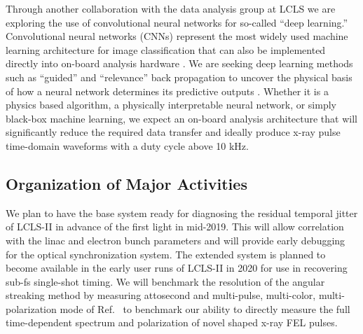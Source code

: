 \documentclass[letterpaper,oneside,11pt]{article}
\begin{document}
Through another collaboration with the data analysis group at LCLS we are exploring the use of convolutional neural networks for so-called ``deep learning.'' %
Convolutional neural networks (CNNs) represent the most widely used machine learning architecture for image classification that can also be implemented directly into on-board analysis hardware \cite{cognimem}.
We are seeking deep learning methods such as ``guided'' and ``relevance'' back propagation to uncover the physical basis of how a neural network determines its predictive outputs \cite{Mihir}.
Whether it is a physics based algorithm, a physically interpretable neural network, or simply black-box machine learning, we expect an on-board analysis architecture that will significantly reduce the required data transfer and ideally produce x-ray pulse time-domain waveforms with a duty cycle above 10 kHz.





\subsection*{Organization of Major Activities\label{timeline}}

We plan to have the base system ready for diagnosing the residual temporal jitter of LCLS-II in advance of the first light in mid-2019.
This will allow correlation with the linac and electron bunch parameters and will provide early debugging for the optical synchronization system.
The extended system is planned to become available in the early user runs of LCLS-II in 2020 for use in recovering sub-fs single-shot timing.
We will benchmark the resolution of the angular streaking method by measuring attosecond and multi-pulse, multi-color, multi-polarization mode of Ref.~\cite{Lutman2016} to benchmark our ability to directly measure the full time-dependent spectrum and polarization of novel shaped x-ray FEL pulses.
\end{document}
